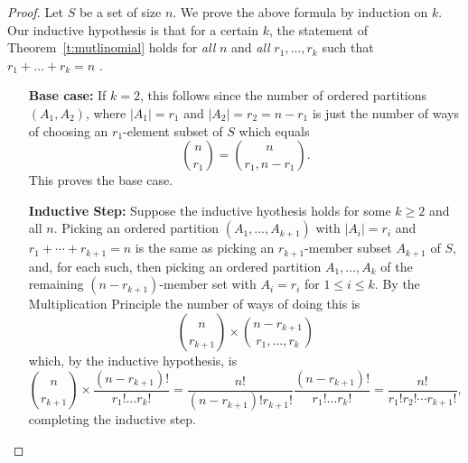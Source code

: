 \documentclass[11pt,dvipsnames]{book}
\numberwithin{equation}{section} %
\numberwithin{figure}{section} %
\numberwithin{table}{section} %
\begin{document}
\begin{proof}
Let $S$ be a set of size $n$. We prove the above formula by induction on $k$. Our inductive hypothesis is that for a certain $k$, the statement of Theorem~\ref{t:mutlinomial} holds for {\em all} $n$ and {\em all} $r_1, \dots , r_k$ such that $r_1 + \dots + r_k = n$ . 
\begin{itemize}
\item[{\bf Base case:}] If $k=2$, this follows since the number of ordered partitions $(A_{1},A_{2})$, where $|A_{1}|=r_{1}$ and $|A_{2}|=r_{2}=n-r_{1}$
is just the number of ways of choosing an $r_1$-element subset of $S$ which equals 
$${n \choose {r_1}} = {n \choose {r_1, n-r_1}}.$$ 
This proves the base case. 
\item[{\bf Inductive Step:}] Suppose the inductive hyothesis holds for some $k\geq 2$ and all $n$. Picking an ordered partition $(A_{1}, \dots,A_{k+1})$ with $|A_{i}|=r_i$ and $r_{1}+\cdots + r_{k+1}=n$ is the same as picking an $r_{k+1}$-member subset $A_{k+1}$ of $S$, and, for each such, then picking an ordered partition $A_1, \dots , A_k$ of the remaining $(n - r_{k+1})$-member set with $A_i = r_i$ for $1 \leq i \leq k$. By the Multiplication Principle the number of ways of doing this is
$$ { n \choose r_{k+1}} \times  {n- r_{k+1} \choose r_1, \dots , r_{k}}$$
which, by the inductive hypothesis, is 
$$ { n \choose r_{k+1}} \times \frac{(n- r_{k+1})!}{ r_1! \dots r_{k}!}= \frac{n!}{(n-r_{k+1})! r_{k+1}!}\frac{(n- r_{k+1})!}{ r_1! \dots r_{k}!}=
\frac{n!}{r_{1}!r_{2}!\cdots r_{k+1}!},$$
completing the inductive step. 
\end{itemize}
\end{proof}
%
\end{document}
